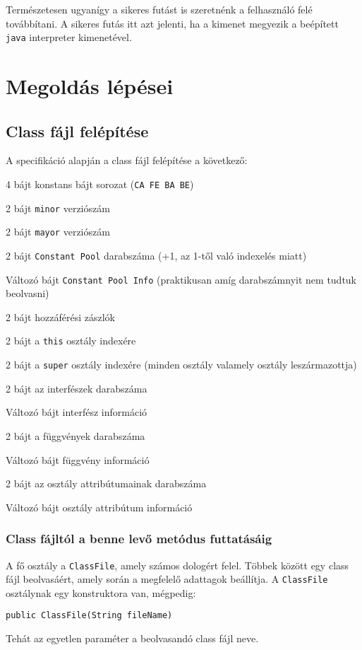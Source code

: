 Természetesen ugyanígy a sikeres futást is szeretnénk a felhasználó felé továbbítani. A sikeres futás itt azt jelenti, ha a kimenet megyezik a beépített \lstinline{java} interpreter kimenetével.

\section{Megoldás lépései}

\subsection{Class fájl felépítése}

A specifikáció alapján a class fájl felépítése a következő:

\begin{compactitem}
	\item 4 bájt konstans bájt sorozat (\lstinline{CA FE BA BE})
	\item 2 bájt \lstinline{minor} verziószám
	\item 2 bájt \lstinline{mayor} verziószám
	\item 2 bájt \lstinline{Constant Pool} darabszáma (+1, az 1-től való indexelés miatt)
	\item Változó bájt \lstinline{Constant Pool Info} (praktikusan amíg darabszámnyit nem tudtuk beolvasni)
	\item 2 bájt hozzáférési zászlók
	\item 2 bájt a \lstinline{this} osztály indexére
	\item 2 bájt a \lstinline{super} osztály indexére (minden osztály valamely osztály leszármazottja)
	\item 2 bájt az interfészek darabszáma
	\item Változó bájt interfész információ
	\item 2 bájt a függvények darabszáma
	\item Változó bájt függvény információ
	\item 2 bájt az osztály attribútumainak darabszáma
	\item Változó bájt osztály attribútum információ
\end{compactitem}

\subsubsection{Class fájltól a benne levő metódus futtatásáig}

A fő osztály a \lstinline{ClassFile}, amely számos dologért felel. Többek között egy class fájl beolvasáért, amely során a megfelelő adattagok beállítja. A \lstinline{ClassFile} osztálynak egy konstruktora van, mégpedig:
\begin{verbatim}
public ClassFile(String fileName)
\end{verbatim}
Tehát az egyetlen paraméter a beolvasandó class fájl neve.


